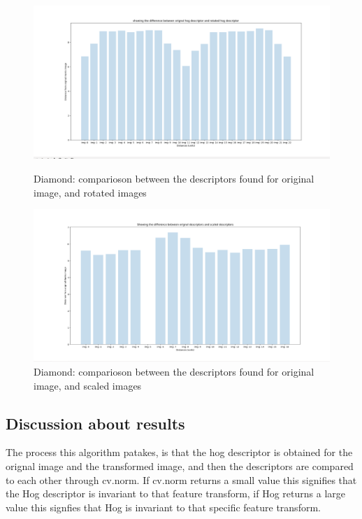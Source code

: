 \documentclass[conference]{IEEEtran}
\begin{document}
\begin{figure}[!htb]
  \centering
  \begin{minipage}[b]{0.4\textwidth}
    \includegraphics[width=\textwidth]{../programme/results/Task_2/dugong/rotation/norm.png}
    \caption{Diamond: comparioson between the descriptors found for original image, and rotated images}
    \label{Dugong: comparioson between the descriptors found for original image, and rotated images}
  \end{minipage}
  \hfill
  \begin{minipage}[b]{0.4\textwidth}
    \includegraphics[width=\textwidth]{../programme/results/Task_2/dugong/scaling/norm.png}
    \caption{Diamond: comparioson between the descriptors found for original image, and scaled images}
    \label{Dugong: comparioson between the descriptors found for original image, and scaled images}
  \end{minipage}
\end{figure}

\subsection{Discussion about results}
The process this algorithm patakes, is that the hog descriptor is obtained for the orignal image and the transformed image, and then the descriptors are compared to each other through cv.norm. If cv.norm returns a small value this signifies that the Hog descriptor is invariant to that feature transform, if Hog returns a large value this signfies that Hog is invariant to that specific feature transform. \par
\end{document}
